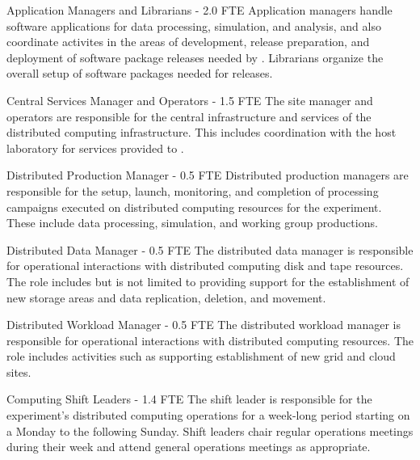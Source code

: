 \begin{description}
\item {Application Managers and Librarians - 2.0 FTE}
Application managers handle software applications for data processing, simulation, and analysis, and also coordinate activites in the areas of development, release preparation, and %
deployment of software package releases needed by . Librarians organize the overall setup of software packages needed for releases. %

\item {Central Services Manager and Operators - 1.5 FTE}
The site manager and operators are responsible for the central infrastructure and services of the  distributed computing infrastructure. This includes coordination with the host laboratory for services provided to . %

\item {Distributed Production Manager - 0.5 FTE}
Distributed production managers are responsible for the setup, launch, monitoring, and %
completion of processing campaigns executed on distributed computing resources for the experiment. %
These include data processing,  simulation, and working group productions. %


\item {Distributed Data Manager - 0.5 FTE}
The distributed data manager is responsible for operational interactions with distributed computing disk and tape resources. The role includes but is not limited to providing support for the establishment of new storage areas and data replication, deletion, and movement. %

\item {Distributed Workload Manager - 0.5 FTE}
The distributed workload manager is responsible for operational interactions with distributed computing resources. The role includes activities such as supporting establishment of new grid and cloud sites. %


\item {Computing Shift Leaders - 1.4 FTE}
The shift leader is %
responsible for the experiment's distributed computing operations for a week-long period  %
starting on a Monday to the following Sunday.  Shift leaders chair regular operations meetings during their week and attend general  operations meetings as appropriate. %


\end{description}

